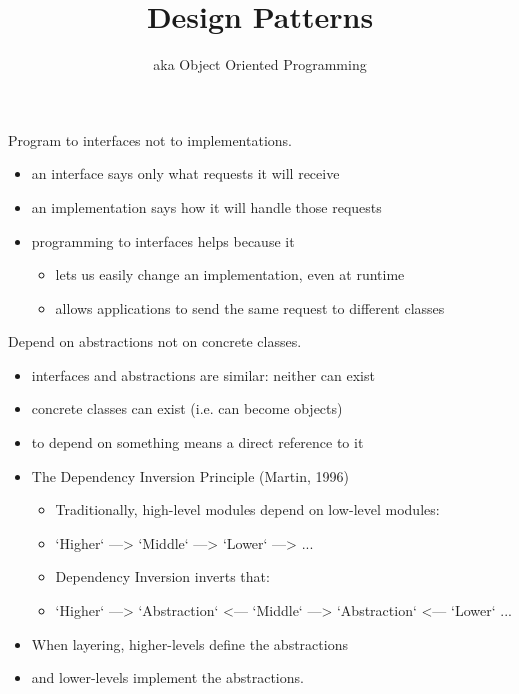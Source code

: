 \documentclass{beamer}
\title{Design Patterns}
\subtitle{aka Object Oriented Programming}
\begin{document}
\begin{frame}
  \titlepage
\end{frame}

\begin{frame}{Program to interfaces not to implementations.}
    \begin{itemize}
        \item an interface says only what requests it will receive
        \item an implementation says how it will handle those requests
        \item programming to interfaces helps because it
            \begin{itemize}
                \item lets us easily change an implementation, even at runtime
                \item allows applications to send the same request to different classes
            \end{itemize}
    \end{itemize}
\end{frame}

\begin{frame}{}
    
\end{frame}

\begin{frame}{Depend on abstractions not on concrete classes.}
    \begin{itemize}
        \item interfaces and abstractions are similar: neither can exist
        \item concrete classes can exist (i.e. can become objects)
        \item to depend on something means a direct reference to it
        \item The Dependency Inversion Principle (Martin, 1996)
        \begin{itemize}
            \item Traditionally, high-level modules depend on low-level modules:
            \item `Higher` ---> `Middle` ---> `Lower` ---> ...
            \item Dependency Inversion inverts that:
            \item `Higher` ---> `Abstraction` <--- `Middle` ---> `Abstraction` <--- `Lower` ...
        \end{itemize}
        \item When layering, higher-levels define the abstractions
        \item and lower-levels implement the abstractions.
    \end{itemize}
\end{frame}
\end{document}
